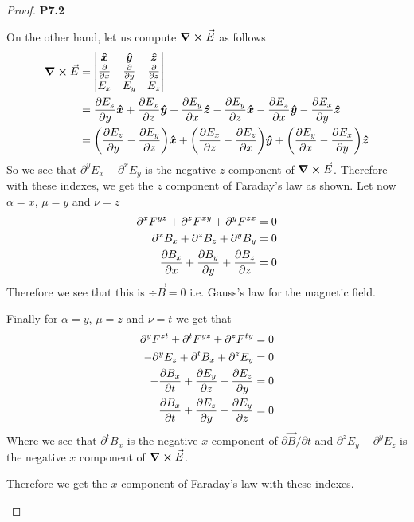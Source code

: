 \documentclass[11pt]{article}
\newcommand{\hatx}{\bm{\hat{x}}}
\newcommand{\haty}{\bm{\hat{y}}}
\newcommand{\hatz}{\bm{\hat{z}}}
\theoremstyle{definition}
\begin{document}
\begin{proof}{\textbf{P7.2}}
\begin{itemize}
    On the other hand, let us compute $\curl \vec{E}$ as follows
    \begin{align*}
        \curl \vec{E} &= \begin{vmatrix}
            \hatx & \haty & \hatz \\
            \partialderivative{}{x} & \partialderivative{}{y}
            & \partialderivative{}{z}\\
            E_x  & E_y & E_z
        \end{vmatrix}\\
        &= \partialderivative{E_z}{y}\hatx
        + \partialderivative{E_x}{z}\haty
        + \partialderivative{E_y}{x}\hatz
        - \partialderivative{E_y}{z}\hatx
        - \partialderivative{E_z}{x}\haty
        - \partialderivative{E_x}{y}\hatz\\
        &= \bigg(\partialderivative{E_z}{y}- \partialderivative{E_y}{z}\bigg)\hatx
        + \bigg(\partialderivative{E_x}{z}
        - \partialderivative{E_z}{x}\bigg)\haty
        + \bigg(\partialderivative{E_y}{x}
        - \partialderivative{E_x}{y}\bigg)\hatz
    \end{align*}
    So we see that $\partial^y E_x - \partial^x E_y$ is the negative $z$
    component of $\curl \vec{E}$.
    Therefore with these indexes, we get the $z$ component of Faraday's law
    as shown.
\cleardoublepage
    Let now $\alpha = x$, $\mu = y$ and $\nu = z$
    \begin{align*}
        \partial^x F^{yz} + \partial^z F^{xy} + \partial^y F^{zx} &= 0\\
        \partial^x B_x + \partial^z B_z + \partial^y B_y &= 0\\
        \partialderivative{B_x}{x} + \partialderivative{B_y}{y}
        + \partialderivative{B_z}{z}&= 0
    \end{align*}
    Therefore we see that this is $\div \vec{B} = 0$ i.e. Gauss's law for
    the magnetic field.

    Finally for $\alpha = y$, $\mu = z$ and $\nu = t$ we get that
    \begin{align*}
        \partial^y F^{zt} + \partial^t F^{yz} + \partial^z F^{ty} &= 0\\
        -\partial^y E_z + \partial^t B_x + \partial^z E_y &= 0\\
        - \partialderivative{B_x}{t}
        + \partialderivative{E_y}{z}
        - \partialderivative{E_z}{y} &= 0\\
        \partialderivative{B_x}{t}
        + \partialderivative{E_z}{y}
        - \partialderivative{E_y}{z} &= 0
    \end{align*}
    Where we see that $\partial^t B_x$ is the negative $x$ component of
    $\partial \vec{B} / \partial t$ and $\partial^z E_y - \partial^y E_z$
    is the negative $x$ component of $\curl \vec{E}$.

    Therefore we get the $x$ component of Faraday's law with these indexes.
\end{itemize}
\end{proof}
\end{document}
